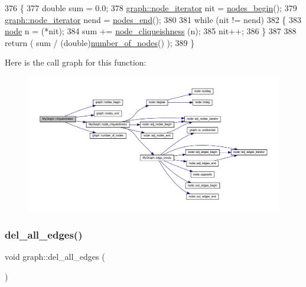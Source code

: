 \begin{DoxyCode}
376 \{
377     \textcolor{keywordtype}{double} sum = 0.0;
378     \mbox{\hyperlink{classgraph_a2cb374b84c133ce13f94e73c3e5da7fa}{graph::node\_iterator}} nit = \mbox{\hyperlink{classgraph_aec053a4b509d1be804237a80044c54c0}{nodes\_begin}}();
379     \mbox{\hyperlink{classgraph_a2cb374b84c133ce13f94e73c3e5da7fa}{graph::node\_iterator}} nend = \mbox{\hyperlink{classgraph_abbf9c0cb5629e98e1142254911238173}{nodes\_end}}();
380     
381     \textcolor{keywordflow}{while} (nit != nend)
382     \{   
383         \mbox{\hyperlink{classnode}{node}} n = (*nit);
384         sum += \mbox{\hyperlink{class_my_graph_a513bec2f1949a01d517dd57cc9c30233}{node\_cliqueishness}} (n);
385         nit++;
386     \}
387     
388     \textcolor{keywordflow}{return} ( sum / (\textcolor{keywordtype}{double})\mbox{\hyperlink{classgraph_a42c78e0a9f115655e3ff0efe35ebfc4e}{number\_of\_nodes}}() );
389 \}
\end{DoxyCode}
Here is the call graph for this function\+:\nopagebreak
\begin{figure}[H]
\begin{center}
\leavevmode
\includegraphics[width=350pt]{class_my_graph_a2bb131d5401dc66c01acb976daa7e981_cgraph}
\end{center}
\end{figure}
\mbox{\label{classgraph_aae52be443c5aef001b5f6758855f15ad}} 
\subsubsection{\texorpdfstring{del\+\_\+all\+\_\+edges()}{del\_all\_edges()}}
{\footnotesize\ttfamily void graph\+::del\+\_\+all\+\_\+edges (\begin{DoxyParamCaption}{ }\end{DoxyParamCaption})\hspace{0.3cm}{\ttfamily [inherited]}}

